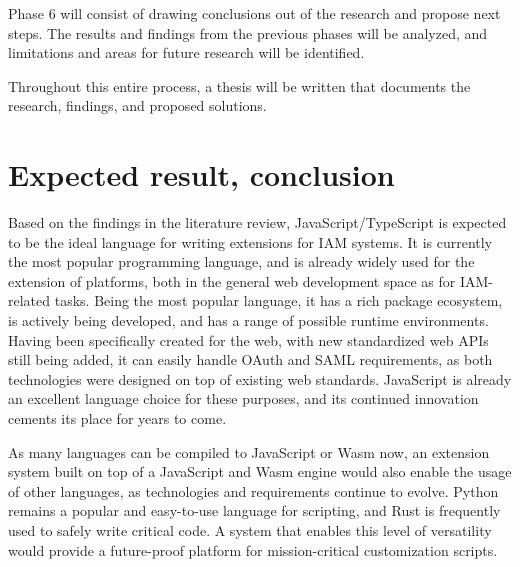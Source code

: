 Phase 6 will consist of drawing conclusions out of the research and propose next steps. The results and findings from the previous phases will be analyzed, and limitations and areas for future research will be identified.

Throughout this entire process, a thesis will be written that documents the research, findings, and proposed solutions.


\section{Expected result, conclusion}%
\label{sec:expected_results}

Based on the findings in the literature review, JavaScript/TypeScript is expected to be the ideal language for writing extensions for IAM systems. It is currently the most popular programming language, and is already widely used for the extension of platforms, both in the general web development space as for IAM-related tasks. Being the most popular language, it has a rich package ecosystem, is actively being developed, and has a range of possible runtime environments. Having been specifically created for the web, with new standardized web APIs still being added, it can easily handle OAuth and SAML requirements, as both technologies were designed on top of existing web standards. JavaScript is already an excellent language choice for these purposes, and its continued innovation cements its place for years to come.

As many languages can be compiled to JavaScript or Wasm now, an extension system built on top of a JavaScript and Wasm engine would also enable the usage of other languages, as technologies and requirements continue to evolve. Python remains a popular and easy-to-use language for scripting, and Rust is frequently used to safely write critical code. A system that enables this level of versatility would provide a future-proof platform for mission-critical customization scripts.

